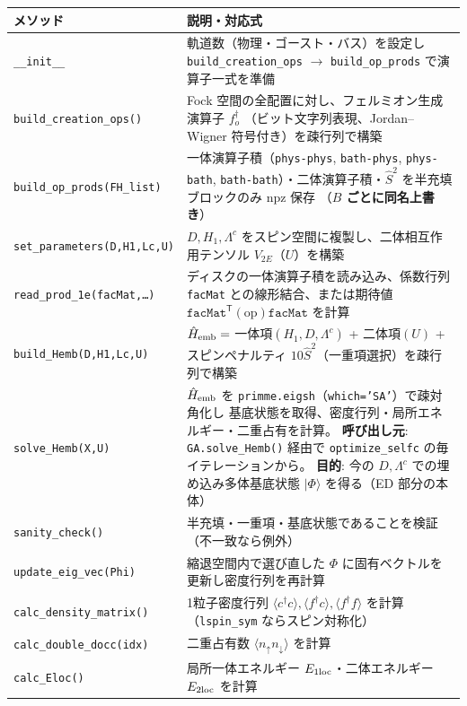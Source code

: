 \documentclass[11pt]{ltjsarticle}
\newcommand{\code}[1]{\texttt{#1}}
\begin{document}
\begin{longtable}{p{}p{}}
\toprule
メソッド & 説明・対応式 \\
\midrule
\code{\_\_init\_\_} & 軌道数（物理・ゴースト・バス）を設定し \code{build\_creation\_ops}
$\to$ \code{build\_op\_prods} で演算子一式を準備 \\
\code{build\_creation\_ops()} & Fock 空間の全配置に対し、フェルミオン生成演算子 $f^\dagger_o$
（ビット文字列表現、Jordan--Wigner 符号付き）を疎行列で構築 \\
\code{build\_op\_prods(FH\_list)} & 一体演算子積（\code{phys-phys}, \code{bath-phys},
\code{phys-bath}, \code{bath-bath}）・二体演算子積・$\hat S^2$ を半充填ブロックのみ npz 保存
（\textbf{$B$ ごとに同名上書き}）\\
\code{set\_parameters(D,H1,Lc,U)} & $D,H_1,\Lambda^c$ をスピン空間に複製し、二体相互作用テンソル
$V_{2E}$（$U$）を構築 \\
\code{read\_prod\_1e(facMat,\ldots)} & ディスクの一体演算子積を読み込み、係数行列 \code{facMat}
との線形結合、または期待値 $\code{facMat}^{\mathsf T}(\text{op})\code{facMat}$ を計算 \\
\code{build\_Hemb(D,H1,Lc,U)} & $\hat H_{\rm emb}=$ 一体項$(H_1,D,\Lambda^c)$ + 二体項$(U)$
+ スピンペナルティ $10\hat S^2$（一重項選択）を疎行列で構築 \\
\code{solve\_Hemb(X,U)} & $\hat H_{\rm emb}$ を \code{primme.eigsh}（\code{which='SA'}）で疎対角化し
基底状態を取得、密度行列・局所エネルギー・二重占有を計算。
\textbf{呼び出し元}: \code{GA.solve\_Hemb()} 経由で \code{optimize\_selfc} の毎イテレーションから。
\textbf{目的}: 今の $D,\Lambda^c$ での埋め込み多体基底状態 $|\Phi\rangle$ を得る（ED 部分の本体） \\
\code{sanity\_check()} & 半充填・一重項・基底状態であることを検証（不一致なら例外） \\
\code{update\_eig\_vec(Phi)} & 縮退空間内で選び直した $\Phi$ に固有ベクトルを更新し密度行列を再計算 \\
\code{calc\_density\_matrix()} & 1粒子密度行列 $\langle c^\dagger c\rangle,\langle f^\dagger c\rangle,
\langle f^\dagger f\rangle$ を計算（\code{lspin\_sym} ならスピン対称化）\\
\code{calc\_double\_docc(idx)} & 二重占有数 $\langle n_\uparrow n_\downarrow\rangle$ を計算 \\
\code{calc\_Eloc()} & 局所一体エネルギー $E_{1{\rm loc}}$・二体エネルギー $E_{2{\rm loc}}$ を計算 \\
\bottomrule
\end{longtable}
\end{document}
